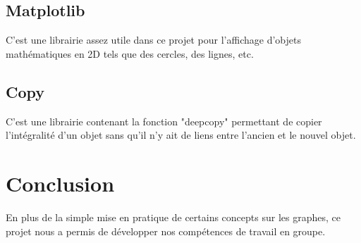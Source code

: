 \documentclass{article}
\begin{document}
	\subsection{Matplotlib}
		C'est une librairie assez utile dans ce projet pour l'affichage d'objets mathématiques en 2D tels que des cercles, des lignes, etc.
	
	\subsection{Copy}
		C'est une librairie contenant la fonction "deepcopy" permettant de copier l'intégralité d'un objet sans qu'il n'y ait de liens entre l'ancien et le nouvel objet.

\section{Conclusion}
	En plus de la simple mise en pratique de certains concepts sur les graphes, ce projet nous a permis de développer nos compétences de travail en groupe.
\end{document}
